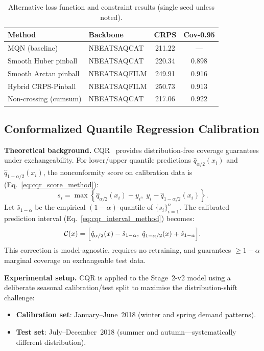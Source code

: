 \begin{table}[H]
\centering
\caption{Alternative loss function and constraint results
  (single seed unless noted).}
\label{tab:alt_loss}
\begin{tabular}{llcc}
\toprule
\textbf{Method} & \textbf{Backbone} & \textbf{CRPS} & \textbf{Cov-0.95} \\
\midrule
MQN (baseline)          & NBEATSAQCAT  & 211.22 & ---   \\
Smooth Huber pinball    & NBEATSAQCAT  & 220.34 & 0.898 \\
Smooth Arctan pinball   & NBEATSAQFILM & 249.91 & 0.916 \\
Hybrid CRPS-Pinball     & NBEATSAQFILM & 250.73 & 0.913 \\
Non-crossing (cumsum)   & NBEATSAQCAT  & 217.06 & 0.922 \\
\bottomrule
\end{tabular}
\end{table}

\subsection{Conformalized Quantile Regression Calibration}
\label{sec:cqr_results}

\noindent
\textbf{Theoretical background.}
CQR~\cite{romano2019cqr} provides distribution-free coverage guarantees
under exchangeability.
For lower/upper quantile predictions $\hat{q}_{\alpha/2}(x_i)$ and
$\hat{q}_{1-\alpha/2}(x_i)$, the nonconformity score on calibration
data is (Eq.~\ref{eq:cqr_score_method}):
\[
s_i = \max\!\left\{
  \hat{q}_{\alpha/2}(x_i) - y_i,\;
  y_i - \hat{q}_{1-\alpha/2}(x_i)
\right\}.
\]
Let $\hat{s}_{1-\alpha}$ be the empirical $(1-\alpha)$-quantile of
$\{s_i\}_{i=1}^{n}$.  The calibrated prediction interval
(Eq.~\ref{eq:cqr_interval_method}) becomes:
\[
\mathcal{C}(x)=\Bigl[
  \hat{q}_{\alpha/2}(x)-\hat{s}_{1-\alpha},\;
  \hat{q}_{1-\alpha/2}(x)+\hat{s}_{1-\alpha}
\Bigr].
\]
This correction is model-agnostic, requires no retraining, and guarantees
$\geq 1-\alpha$ marginal coverage on exchangeable test data.

\medskip
\noindent
\textbf{Experimental setup.}
CQR is applied to the Stage~2-v2 model using a deliberate seasonal
calibration/test split to maximise the distribution-shift challenge:
\begin{itemize}
  \item \textbf{Calibration set}: January--June~2018
        (winter and spring demand patterns).
  \item \textbf{Test set}: July--December~2018
        (summer and autumn---systematically different distribution).
\end{itemize}

